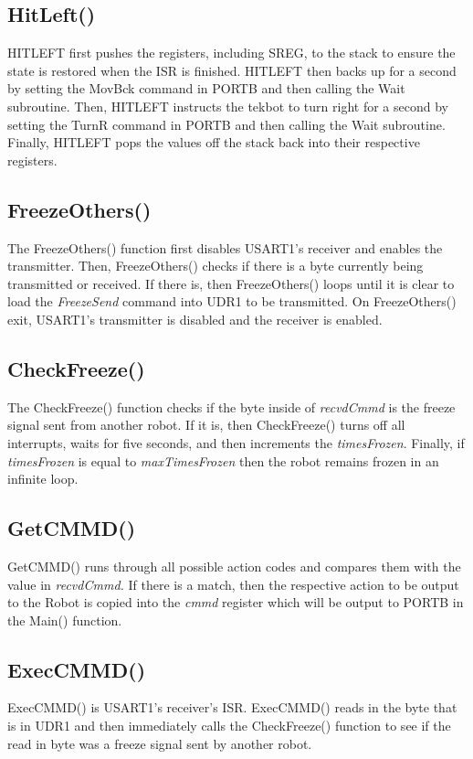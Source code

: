 \documentclass[12pt,letterpaper]{article}
\begin{document}
\subsection{HitLeft()}
	HITLEFT first pushes the registers, including SREG, to the stack to ensure the state is restored when the ISR is finished.
	HITLEFT then backs up for a second by setting the MovBck command in PORTB and then calling the Wait subroutine.
	Then, HITLEFT instructs the tekbot to turn right for a second by setting the TurnR command in PORTB and then calling the Wait subroutine.
	Finally, HITLEFT pops the values off the stack back into their respective registers.


\subsection{FreezeOthers()}
	The FreezeOthers() function first disables USART1's receiver and enables the transmitter.
	Then, FreezeOthers() checks if there is a byte currently being transmitted or received.
	If there is, then FreezeOthers() loops until it is clear to load the \textit{FreezeSend} command into UDR1 to be transmitted.
	On FreezeOthers() exit, USART1's transmitter is disabled and the receiver is enabled.



\subsection{CheckFreeze()}
	The CheckFreeze() function checks if the byte inside of \textit{recvdCmmd} is the freeze signal sent from another robot.
	If it is, then CheckFreeze() turns off all interrupts, waits for five seconds, and then increments the \textit{timesFrozen}.
	Finally, if \textit{timesFrozen} is equal to \textit{maxTimesFrozen} then the robot remains frozen in an infinite loop.


\subsection{GetCMMD()}
	GetCMMD() runs through all possible action codes and compares them with the value in \textit{recvdCmmd.}
	If there is a match, then the respective action to be output to the Robot is copied into the \textit{cmmd} register which will be output to PORTB in the Main() function.


\subsection{ExecCMMD()}
	ExecCMMD() is USART1's receiver's ISR.
	ExecCMMD() reads in the byte that is in UDR1 and then immediately calls the CheckFreeze() function to see if the read in byte was a freeze signal sent by another robot.
	
\end{document}
